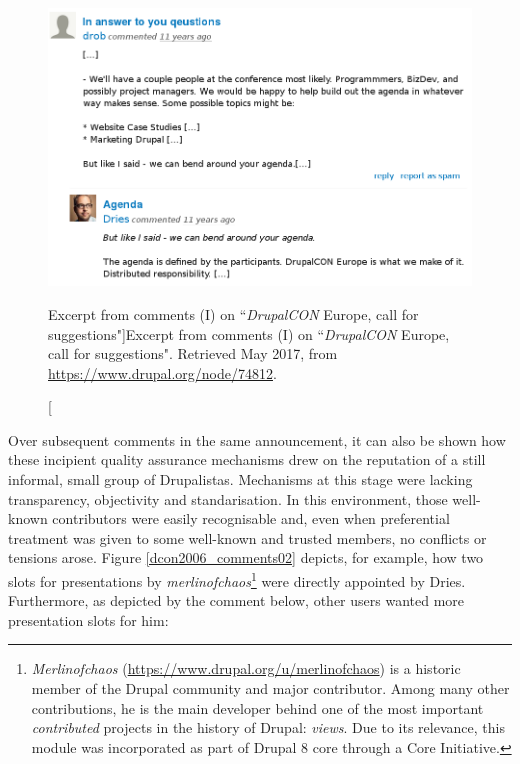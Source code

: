 \begin{figure}[H]
  \centering
\includegraphics[width=\textwidth]{img/quotes_replacement/dcon_brussels_2016_comments.png}
\caption[Excerpt from comments (I) on ``\textit{DrupalCON} Europe, call for suggestions"]{Excerpt from comments (I) on ``\textit{DrupalCON} Europe, call for suggestions". Retrieved  May 2017, from \url{https://www.drupal.org/node/74812}.}
\label{dcon2006_comments01}
\end{figure}

Over subsequent comments in the same announcement, it can also be shown how these incipient quality assurance mechanisms drew on the reputation of a still informal, small group of Drupalistas. Mechanisms at this stage were lacking transparency, objectivity and standarisation. In this environment, those well-known contributors were easily recognisable and, even when preferential treatment was given to some well-known and trusted members, no conflicts or tensions arose. Figure \ref{dcon2006_comments02} depicts, for example, how two slots for presentations by \textsl{merlinofchaos}\footnote{\textsl{Merlinofchaos} (\url{https://www.drupal.org/u/merlinofchaos}) is a historic member of the Drupal community and major contributor. Among many other contributions, he is the main developer behind one of the most important \textit{contributed} projects in the history of Drupal: \textit{views}. Due to its relevance, this module was incorporated as part of Drupal 8 core through a Core Initiative.} were directly appointed by Dries. Furthermore, as depicted by the comment below, other users wanted more presentation slots for him:


